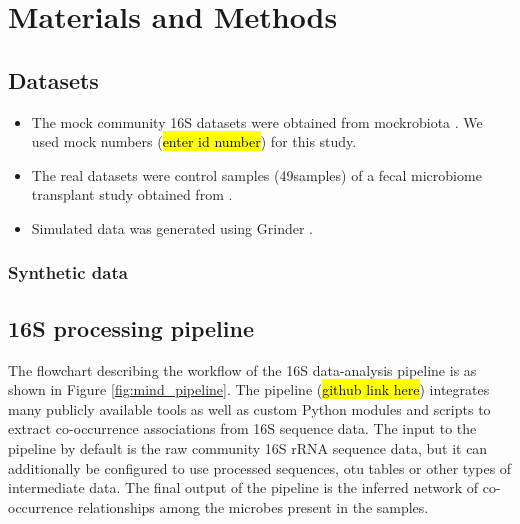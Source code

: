 
\section*{Materials and Methods}

  \subsection*{Datasets}

  \vspace{-5mm}
  \begin{itemize}
    \item The mock community 16S datasets were obtained from mockrobiota \cite{Bokulich2016}. We used mock numbers (\hl{enter id number}) for this study.
    \item The real datasets were control samples (49samples)  of a fecal microbiome transplant study obtained from \cite{Kang2017}.
    \item Simulated data was generated using Grinder \cite{Angly2012}.
  \end{itemize}

  \subsubsection*{Synthetic data}



  \subsection*{16S processing pipeline}

  \vspace{-5mm}

  The flowchart describing the workflow of the 16S data-analysis pipeline is as shown in Figure \ref{fig:mind_pipeline}.
  The pipeline (\hl{github link here}) integrates many publicly available tools as well as custom Python modules and scripts to extract co-occurrence associations from 16S sequence data.
  The input to the pipeline by default is the raw community 16S rRNA sequence data, but it can additionally be configured to use processed sequences, \ac{otu} tables or other types of intermediate data.
  The final output of the pipeline is the inferred network of co-occurrence relationships among the microbes present in the samples.

